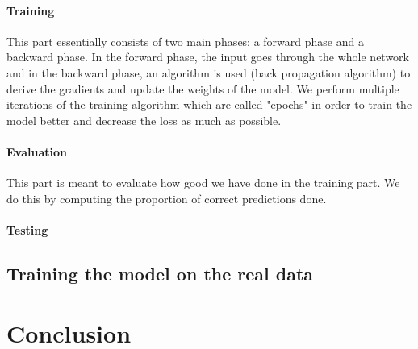 \documentclass[10pt,conference,compsocconf]{IEEEtran}
\begin{document}
\paragraph{Training} This part essentially consists of two main phases: a forward phase and a backward phase. In the forward phase, the input goes through the whole network and in the backward phase, an algorithm is used (back propagation algorithm) to derive the gradients and update the weights of the model. We perform multiple iterations of the training algorithm which are called "epochs" in order to train the model better and decrease the loss as much as possible.
\paragraph{Evaluation} This part is meant to evaluate how good we have done in the training part. We do this by computing the proportion of correct predictions done.
\paragraph{Testing} %

\subsection{Training the model on the real data}

\section{Conclusion}



\end{document}
